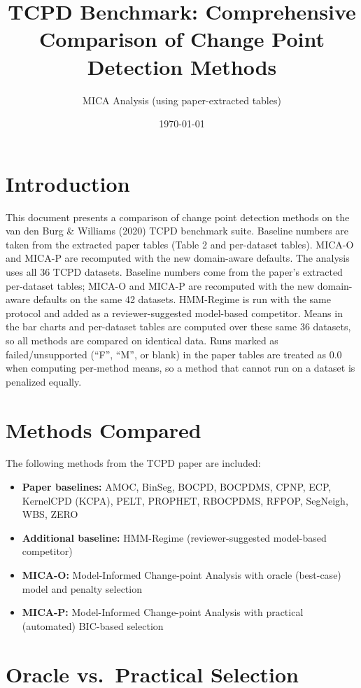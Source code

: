 \documentclass[11pt,a4paper]{article}
\title{TCPD Benchmark: Comprehensive Comparison of Change Point Detection Methods}
\author{MICA Analysis (using paper-extracted tables)}
\date{\today}
\begin{document}
\maketitle

\section{Introduction}

This document presents a comparison of change point detection methods on the
van den Burg \& Williams (2020) TCPD benchmark suite. Baseline numbers are taken
from the extracted paper tables (Table 2 and per-dataset tables). MICA-O and MICA-P
are recomputed with the new domain-aware defaults. The analysis uses all 36 TCPD datasets. Baseline numbers come from the paper's extracted per-dataset tables; MICA-O and MICA-P are recomputed with the new domain-aware defaults on the same 42 datasets. HMM-Regime is run with the same protocol and added as a reviewer-suggested model-based competitor. Means in the bar charts and per-dataset tables are computed over these same 36 datasets, so all methods are compared on identical data. Runs marked as failed/unsupported (``F'', ``M'', or blank) in the paper tables are treated as 0.0 when computing per-method means, so a method that cannot run on a dataset is penalized equally.

\section{Methods Compared}

The following methods from the TCPD paper are included:
\begin{itemize}
    \item \textbf{Paper baselines:} AMOC, BinSeg, BOCPD, BOCPDMS, CPNP, ECP, KernelCPD (KCPA), PELT, PROPHET, RBOCPDMS, RFPOP, SegNeigh, WBS, ZERO
    \item \textbf{Additional baseline:} HMM-Regime (reviewer-suggested model-based competitor)
    \item \textbf{MICA-O:} Model-Informed Change-point Analysis with oracle (best-case) model and penalty selection
    \item \textbf{MICA-P:} Model-Informed Change-point Analysis with practical (automated) BIC-based selection
\end{itemize}

\section{Oracle vs.\ Practical Selection}
\end{document}
